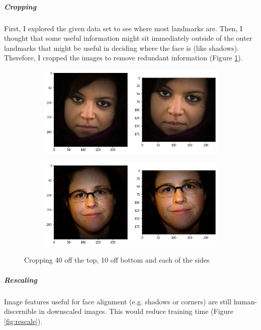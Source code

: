 \documentclass{article}
\begin{document}
\subparagraph{Cropping} First, I explored the given data set to see where most landmarks are. Then, I thought that some useful information might sit immediately outside of the outer landmarks that might be useful in deciding where the face is (like shadows). Therefore, I cropped the images to remove redundant information (Figure \ref{fig:crop}).

\begin{figure}[h]
  \begin{subfigure}[b]{0.49\textwidth}
    \includegraphics[width=\textwidth]{crop1}
  \end{subfigure}
  \hfill
  \begin{subfigure}[b]{0.49\textwidth}
    \includegraphics[width=\textwidth]{crop5}
  \end{subfigure}
  \hfill
  \caption{Cropping 40 off the top, 10 off bottom and each of the sides}
  \label{fig:crop}
\end{figure}

\subparagraph{Rescaling} Image features useful for face alignment (e.g. shadows or corners) are still human-discernible in downscaled images. This would reduce training time (Figure \ref{fig:rescale}).
\end{document}
